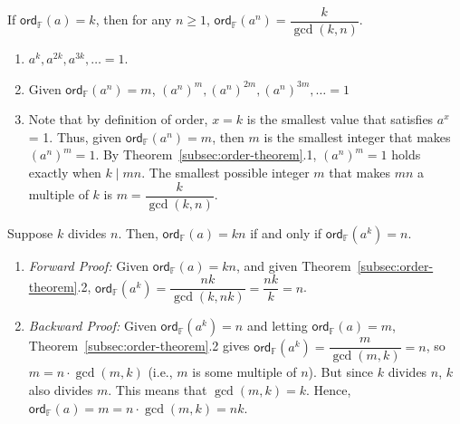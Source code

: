 \begin{tcolorbox}[title={\textbf{\tboxtheorem{\ref*{subsec:order-theorem}.2} Order Property (II)}}]
If $\textsf{ord}_{\mathbb{F}}(a) = k$, then for any $n \geq 1$, $\textsf{ord}_{\mathbb{F}}(a^n) = \dfrac{k} {\gcd(k, n)}$.
\end{tcolorbox}
\begin{myproof}
    \begin{enumerate}
    \item $a^k, a^{2k}, a^{3k}, \ldots = 1$. 
    \item Given $\textsf{ord}_{\mathbb{F}}(a^n) = m$, $(a^n)^m, (a^n)^{2m}, (a^n)^{3m}, \ldots = 1$ 
    \item Note that by definition of order, $x=k$ is the smallest value that satisfies $a^x$ = 1. Thus, given $\textsf{ord}_{\mathbb{F}}(a^n) = m$, then $m$ is the smallest integer that makes $(a^n)^m = 1$. By Theorem~\ref*{subsec:order-theorem}.1, $(a^n)^m=1$ holds exactly when $k\mid mn$. The smallest possible integer $m$ that makes $mn$ a multiple of $k$ is $m = \dfrac{k}{\gcd(k, n)}$.
    \end{enumerate}
\end{myproof}

\begin{tcolorbox}[title={\textbf{\tboxtheorem{\ref*{subsec:order-theorem}.3} Order Property (III)}}]
Suppose $k$ divides $n$.  Then, $\textsf{ord}_{\mathbb{F}}(a) = kn$ if and only if $\textsf{ord}_{\mathbb{F}}(a^k) = n$.
\end{tcolorbox}
\begin{myproof}
\begin{enumerate}
    \item \textit{Forward Proof:} Given $\textsf{ord}_{\mathbb{F}}(a) = kn$, and given Theorem~\ref*{subsec:order-theorem}.2, $\textsf{ord}_{\mathbb{F}}(a^k) = \dfrac{nk}{\gcd(k, nk)} = \dfrac{nk}{k} = n$.
    \item \textit{Backward Proof:} Given $\textsf{ord}_{\mathbb{F}}(a^k)=n$ and letting $\textsf{ord}_{\mathbb{F}}(a)=m$, Theorem~\ref*{subsec:order-theorem}.2 gives $\textsf{ord}_{\mathbb{F}}(a^k)=\dfrac{m}{\gcd(m,k)}=n$, so $m=n\cdot\gcd(m,k)$ (i.e., $m$ is some multiple of $n$). But since $k$ divides $n$, $k$ also divides $m$. This means that $\gcd(m,k) = k$. Hence, $\textsf{ord}_{\mathbb{F}}(a)=m=n\cdot\gcd(m,k)=nk$.
\end{enumerate}
\end{myproof}

